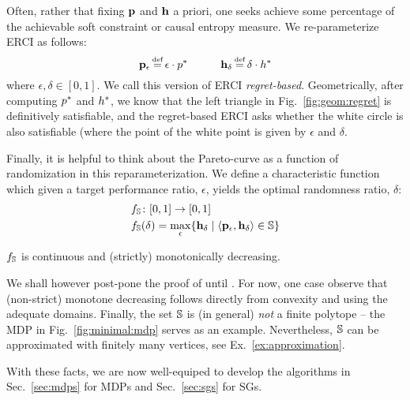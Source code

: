 
Often, rather that fixing $\mathbf{p}$ and $\mathbf{h}$ a
  priori, one seeks achieve some percentage of the achievable soft
  constraint or causal entropy measure.  We
  re-parameterize ERCI as follows:
  \begin{equation}
    \scthreshold_\epsilon \eqdef \epsilon \cdot \scopt
    \hspace{3em}
    \randomness_\delta \eqdef  \delta \cdot \rndopt
  \end{equation}
  where $\epsilon, \delta \in [0, 1]$. We call this version of ERCI \emph{regret-based}. Geometrically, after computing $p^{*}$ and $h^{*}$, we know that the left triangle in Fig.~\ref{fig:geom:regret} is definitively satisfiable, and the regret-based ERCI asks whether the white circle is also satisfiable (where the point of the white point is given by $\epsilon$ and $\delta$. %

Finally, it is helpful to think about the Pareto-curve as a function of randomization in this reparameterization.  We define a characteristic function which given a target
performance ratio, $\epsilon$, yields the optimal randomness ratio,
$\delta$:
\begin{equation}
  \begin{split}
    & f_\mathbb{S}\colon [0,1] \rightarrow [0, 1]    \\
    & f_\mathbb{S}(\delta) = \max_\epsilon \{ \mathbf{h}_\delta \mid \langle
    \mathbf{p}_\epsilon, \mathbf{h}_\delta \rangle \in \mathbb{S} \} 
  \end{split}
\end{equation}
\begin{proposition}\label{prop:monotone}
  $f_\mathbb{S}$ is continuous and (strictly) monotonically decreasing.
\end{proposition}
 We shall however post-pone the proof of
 until {\color{red}{where?}}. For now, one case observe that
(non-strict) monotone decreasing follows directly from convexity and
using the adequate domains.
Finally, the set  $\mathbb{S}$ is (in general) \emph{not} a finite polytope -- the MDP in Fig.~\ref{fig:minimal:mdp} serves as an example. Nevertheless,  $\mathbb{S}$ can be approximated with finitely many vertices, see Ex.~\ref{ex:approximation}.

With these facts, we are now well-equiped to develop the algorithms in Sec.~\ref{sec:mdps} for MDPs and Sec.~\ref{sec:sgs} for SGs.

